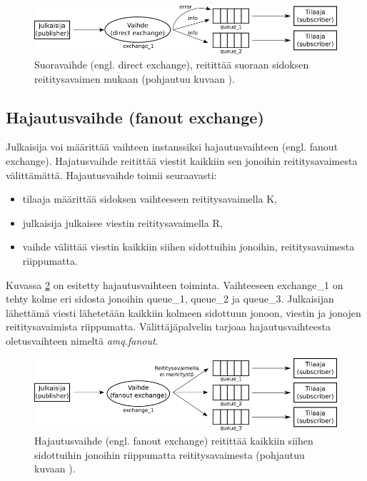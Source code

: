 \begin{figure}[ht!]
	\includegraphics[width=1\textwidth]{pictures/amqp-direct-exchange.png}
	\caption{Suoravaihde (engl. direct exchange), reitittää suoraan sidoksen reititysavaimen mukaan (pohjautuu kuvaan \mbox{\cite{RabbitMQ-Tutorial-Routing}}).}
	\label{fig:amqp-direct-exchange}
\end{figure}


\subsection{Hajautusvaihde (fanout exchange)}
Julkaisija voi määrittää vaihteen instanssiksi hajautusvaihteen (engl. fanout exchange). Hajatusvaihde reitittää viestit kaikkiin sen jonoihin reititysavaimesta välittämättä. Hajautusvaihde toimii seuraavasti:
\begin{itemize}
	\item tilaaja määrittää sidoksen vaihteeseen reititysavaimella K,
	\item julkaisija julkaisee viestin reititysavaimella R,
	\item vaihde välittää viestin kaikkiin siihen sidottuihin jonoihin, reititysavaimesta riippumatta.
\end{itemize}
Kuvassa \ref{fig:amqp-fanout-exchange} on esitetty hajautusvaihteen toiminta. Vaihteeseen exchange\_1 on tehty kolme eri sidosta jonoihin queue\_1, queue\_2 ja queue\_3. Julkaisijan lähettämä viesti lähetetään kaikkiin kolmeen sidottuun jonoon, viestin ja jonojen reititysavaimista riippumatta. Välittäjäpalvelin tarjoaa hajautusvaihteesta oletusvaihteen nimeltä \emph{amq.fanout}. \mbox{\cite[s.~27]{AMQP-specification}}

\begin{figure}[ht!]
	\includegraphics[width=1\textwidth]{pictures/amqp-fanout-exchange.png}
	\caption{Hajautusvaihde (engl. fanout exchange) reitittää kaikkiin siihen sidottuihin jonoihin riippumatta reititysavaimesta (pohjautuu kuvaan \mbox{\cite{RabbitMQ-AMQP-0-9-1-Model-Explained}}).}
	\label{fig:amqp-fanout-exchange}
\end{figure}


